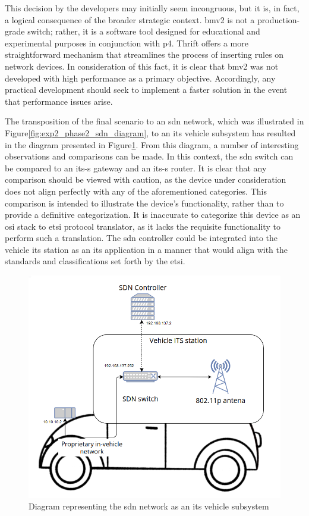 This decision by the developers may initially seem incongruous, but it is, in fact, a logical consequence of the broader strategic context. \gls{bmv2} is not a production-grade switch; rather, it is a software tool designed for educational and experimental purposes in conjunction with \gls{p4}. Thrift offers a more straightforward mechanism that streamlines the process of inserting rules on network devices. 
In consideration of this fact, it is clear that \gls{bmv2} was not developed with high performance as a primary objective. Accordingly, any practical development should seek to implement a faster solution in the event that performance issues arise.

The transposition of the final scenario to an \gls{sdn} network, which was illustrated in Figure\ref{fig:exp2_phase2_sdn_diagram}, to an \gls{its} vehicle subsystem has resulted in the diagram presented in Figure\ref{fig:exp2_vehicle_subsystem}. From this diagram, a number of interesting observations and comparisons can be made. 
In this context, the \gls{sdn} switch can be compared to an \gls{its-s} gateway and an \gls{its-s} router. It is clear that any comparison should be viewed with caution, as the device under consideration does not align perfectly with any of the aforementioned categories. This comparison is intended to illustrate the device's functionality, rather than to provide a definitive categorization. It is inaccurate to categorize this device as an \gls{osi} stack to \gls{etsi} protocol translator, as it lacks the requisite functionality to perform such a translation.
The \gls{sdn} controller could be integrated into the vehicle \gls{its} station as an \gls{its} application in a manner that would align with the standards and classifications set forth by the \gls{etsi}.

\begin{figure}
	\centering
	\includegraphics[width=\textwidth]{Chapters/Figures/tests/bmv2_phase_2/its_vehicle_diagram.PNG}
	\caption{Diagram representing the \gls{sdn} network as an \gls{its} vehicle subsystem}
	\label{fig:exp2_vehicle_subsystem}
\end{figure}

